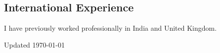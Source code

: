 \documentclass[12pt,letterpaper]{article}
\newcommand{\listitemspace}{0.15em}
\renewenvironment{itemize}
{\begin{list}{}{\setlength{\leftmargin}{0em}
				\setlength{\parskip}{0em}
				\setlength{\itemsep}{\listitemspace}
				\setlength{\parsep}{\listitemspace}}}
{\end{list}}
\begin{document}
\subsection*{International Experience}

\begin{itemize}
	
	\item I have previously worked professionally in India and United Kingdom.
	
\end{itemize}



\begin{center}
	\vspace{6em}
	Updated \monthyeardate\today
\end{center}

%
%
%
%
%
%
%
\end{document}
